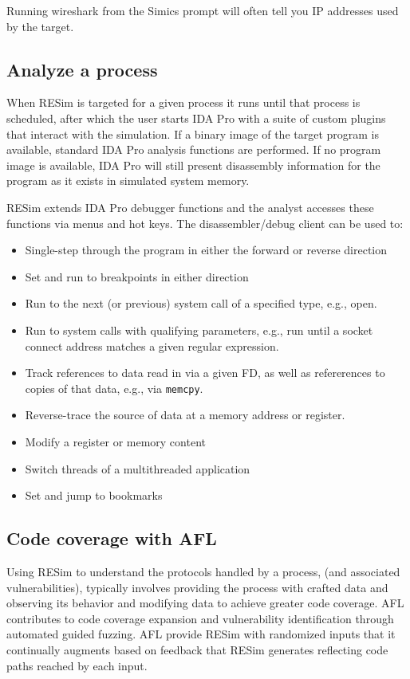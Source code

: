 \documentclass[titlepage]{article}
\begin{document}
Running wireshark from the Simics prompt will often tell you IP addresses used by the target.

\subsection{Analyze a process}
When RESim is targeted for a given process it runs until that process is scheduled, after which the user starts IDA Pro with a suite of custom plugins that interact with the simulation.  If a binary image of the target program is available, standard IDA Pro analysis functions are performed.  If no program image is available, IDA Pro will still present disassembly information for the program as it exists in simulated system memory.  

RESim extends IDA Pro debugger functions and the analyst accesses these functions via menus and hot keys.   The disassembler/debug client can be used to:
\begin{itemize}
\item Single-step through the program in either the forward or reverse direction
\item Set and run to breakpoints in either direction
\item Run to the next (or previous) system call of a specified type, e.g., open.
\item Run to system calls with qualifying parameters, e.g., run until a socket connect address matches a given regular expression.
\item Track references to data read in via a given FD, as well as refererences to copies of that data, e.g., via {\tt memcpy}.
\item Reverse-trace the source of data at a memory address or register.
\item Modify a register or memory content
\item Switch threads of a multithreaded application
\item Set and jump to bookmarks
\end{itemize}

\subsection{Code coverage with AFL}
Using RESim to understand the protocols handled by a process, (and associated vulnerabilities),  typically involves providing the process with
crafted data and observing its behavior and modifying data to achieve greater code coverage.  AFL contributes to code coverage expansion
and vulnerability identification through automated guided fuzzing.  AFL provide RESim with randomized inputs that 
it continually augments based on feedback that RESim generates reflecting code paths reached by each input.  
\end{document}

